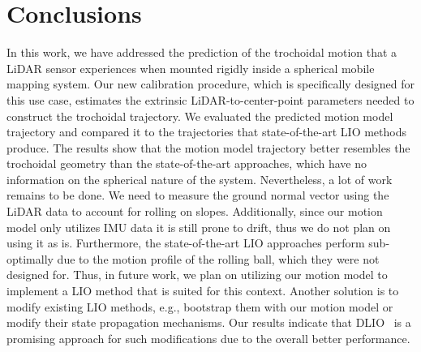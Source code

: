 \section{Conclusions}

In this work, we have addressed the prediction of the trochoidal motion that a LiDAR sensor experiences when mounted rigidly inside a spherical mobile mapping system.
Our new calibration procedure, which is specifically designed for this use case, estimates the extrinsic LiDAR-to-center-point parameters needed to construct the trochoidal trajectory.
We evaluated the predicted motion model trajectory and compared it to the trajectories that state-of-the-art LIO methods produce.
The results show that the motion model trajectory better resembles the trochoidal geometry than the state-of-the-art approaches, which have no information on the spherical nature of the system.
Nevertheless, a lot of work remains to be done.
We need to measure the ground normal vector using the LiDAR data to account for rolling on slopes.
Additionally, since our motion model only utilizes IMU data it is still prone to drift, thus we do not plan on using it as is.
Furthermore, the state-of-the-art LIO approaches perform sub-optimally due to the motion profile of the rolling ball, which they were not designed for.
Thus, in future work, we plan on utilizing our motion model to implement a LIO method that is suited for this context.
Another solution is to modify existing LIO methods, e.g., bootstrap them with our motion model or modify their state propagation mechanisms.
Our results indicate that DLIO~\cite{10160508} is a promising approach for such modifications due to the overall better performance.

